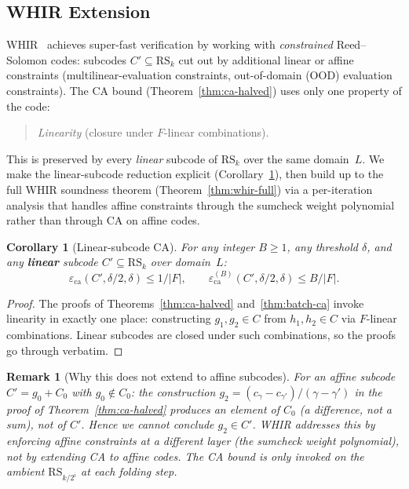 \documentclass[11pt]{article}
\newtheorem{corollary}[theorem]{Corollary}
\newtheorem{remark}[theorem]{Remark}
\newcommand{\RS}{\mathrm{RS}}
\begin{document}
\subsection{WHIR Extension}
\label{subsec:whir}

WHIR~\cite{WHIR} achieves super-fast verification by working with \emph{constrained} Reed--Solomon codes: subcodes $C' \subseteq \RS_k$ cut out by additional linear or affine constraints (multilinear-evaluation constraints, out-of-domain (OOD) evaluation constraints). The CA bound (Theorem~\ref{thm:ca-halved}) uses only one property of the code:

\begin{quote}
\emph{Linearity} (closure under $F$-linear combinations).
\end{quote}

This is preserved by every \emph{linear} subcode of $\RS_k$ over the same domain~$L$. We make the linear-subcode reduction explicit (Corollary~\ref{cor:whir}), then build up to the full WHIR soundness theorem (Theorem~\ref{thm:whir-full}) via a per-iteration analysis that handles affine constraints through the sumcheck weight polynomial rather than through CA on affine codes.

\begin{corollary}[Linear-subcode CA]
\label{cor:whir}
For any integer $B \geq 1$, any threshold $\delta$, and any \textbf{linear} subcode $C' \subseteq \RS_k$ over domain~$L$:
$$\varepsilon_{\mathrm{ca}}(C', \delta/2, \delta) \leq 1/|F|, \qquad \varepsilon_{\mathrm{ca}}^{(B)}(C', \delta/2, \delta) \leq B/|F|.$$
\end{corollary}

\begin{proof}
The proofs of Theorems~\ref{thm:ca-halved} and~\ref{thm:batch-ca} invoke linearity in exactly one place: constructing $g_1, g_2 \in C$ from $h_1, h_2 \in C$ via $F$-linear combinations. Linear subcodes are closed under such combinations, so the proofs go through verbatim.
\end{proof}

\begin{remark}[Why this does not extend to affine subcodes]
\label{rem:why-not-affine}
For an affine subcode $C' = g_0 + C_0$ with $g_0 \notin C_0$: the construction $g_2 = (c_\gamma - c_{\gamma'})/(\gamma - \gamma')$ in the proof of Theorem~\ref{thm:ca-halved} produces an element of $C_0$ (a difference, not a sum), \emph{not} of $C'$. Hence we cannot conclude $g_2 \in C'$. WHIR addresses this by enforcing affine constraints at a different layer (the sumcheck weight polynomial), not by extending CA to affine codes. The CA bound is only invoked on the \emph{ambient} $\RS_{k/2^i}$ at each folding step.
\end{remark}
\end{document}
